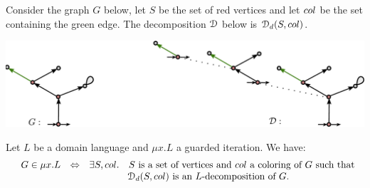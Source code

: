 \begin{example} Consider the graph $G$ below, let $S$ be the set of red vertices and let $\col$ be the set containing the green edge. The decomposition $\mathcal D$ below is $\cD_\mathsf{d}(S,\col)$.
\begin{center}
\includegraphics[scale=.33]{Pictures/decomp-dom}
\end{center}
\end{example}

\begin{proposition}\label{prop:decomp-iteration-dom} Let $L$ be  a domain language and $\mu x. L$ a guarded iteration. We have:
$$\begin{array}{rll}
 \quad G\in \mu x. L& \Leftrightarrow& \exists S, \col.\quad  S \text{ is a set of vertices and $\col$ a coloring of $G$ such that }\\
                      &             & \qquad\qquad \cD_\mathsf{d}(S,\col) \text{ is an $L$-decomposition of $G$.} 
\end{array}
$$
\end{proposition}

